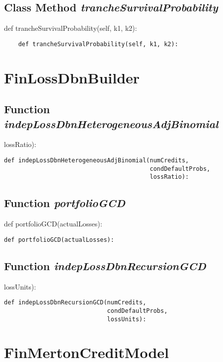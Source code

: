 \documentclass[twoside,11pt]{book}
\begin{document}
\subsection{Class Method {\it trancheSurvivalProbability}}
def trancheSurvivalProbability(self, k1, k2):

\begin{lstlisting}
    def trancheSurvivalProbability(self, k1, k2):
\end{lstlisting}

\newpage
\section{FinLossDbnBuilder}

\subsection{Function {\it indepLossDbnHeterogeneousAdjBinomial}}
lossRatio):

\begin{lstlisting}
def indepLossDbnHeterogeneousAdjBinomial(numCredits,
                                         condDefaultProbs,
                                         lossRatio):
\end{lstlisting}

\subsection{Function {\it portfolioGCD}}
def portfolioGCD(actualLosses):

\begin{lstlisting}
def portfolioGCD(actualLosses):
\end{lstlisting}

\subsection{Function {\it indepLossDbnRecursionGCD}}
lossUnits):

\begin{lstlisting}
def indepLossDbnRecursionGCD(numCredits,
                             condDefaultProbs,
                             lossUnits):
\end{lstlisting}

\newpage
\section{FinMertonCreditModel}
\end{document}
